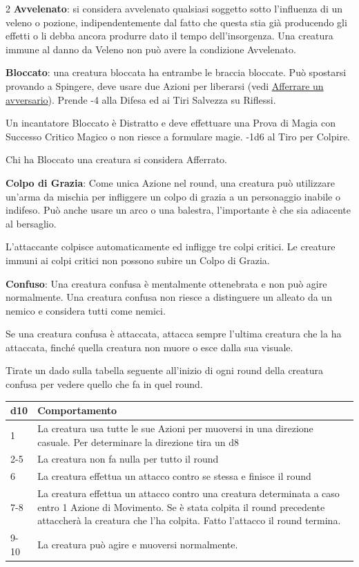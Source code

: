 \begin{multicols}{2}
\textbf{Avvelenato}: si considera avvelenato qualsiasi soggetto sotto l'influenza di un veleno o pozione, indipendentemente dal fatto che questa stia già producendo gli effetti o li debba ancora produrre dato il tempo dell'insorgenza. Una creatura immune al danno da Veleno non può avere la condizione Avvelenato.

\textbf{Bloccato}\hypertarget{bloccato}{}: una creatura bloccata ha entrambe le braccia bloccate. Può spostarsi provando a Spingere, deve usare due Azioni per liberarsi (vedi \hyperlink{afferrareunavversario}{Afferrare un avversario}). Prende -4 alla Difesa ed ai Tiri Salvezza su Riflessi.

Un incantatore Bloccato è Distratto e deve effettuare una Prova di Magia con Successo Critico Magico o non riesce a formulare magie. -1d6 al Tiro per Colpire.

Chi ha Bloccato una creatura si considera Afferrato.

\textbf{Colpo di Grazia}: Come unica Azione nel round, una creatura può utilizzare un'arma da mischia per infliggere un colpo di grazia a un personaggio inabile o indifeso. Può anche usare un arco o una balestra, l'importante è che sia adiacente al bersaglio.

L'attaccante colpisce automaticamente ed infligge tre colpi critici. Le creature immuni ai colpi critici non possono subire un Colpo di Grazia.

\textbf{Confuso}: \hypertarget{confusionecondizione}{}Una creatura confusa è mentalmente ottenebrata e non può agire normalmente. Una creatura confusa non riesce a distinguere un alleato da un nemico e considera tutti come nemici.

Se una creatura confusa è attaccata, attacca sempre l'ultima creatura che la ha attaccata, finché quella creatura non muore o esce dalla sua visuale.

Tirate un dado sulla tabella seguente all'inizio di ogni round della creatura confusa per vedere quello che fa in quel round.

\medskip

\noindent\begin{tabularx}{\linewidth}{lX}
	\toprule
\rowcolor{gray!20}\textbf{d10} & \textbf{Comportamento} \\
\toprule
1 & La creatura usa tutte le sue Azioni per muoversi in una direzione casuale. Per determinare la direzione tira un d8\\
\rowcolor{gray!20}2-5 & La creatura non fa nulla per tutto il round\\
6 &  La creatura effettua un attacco contro se stessa e finisce il round\\
\rowcolor{gray!20}7-8 & La creatura effettua un attacco contro una creatura determinata a caso entro 1 Azione di Movimento. Se è stata colpita il round precedente attaccherà la creatura che l'ha colpita. Fatto l'attacco il round termina.\\
9-10 & La creatura può agire e muoversi normalmente.
\end{tabularx}


\end{multicols}
